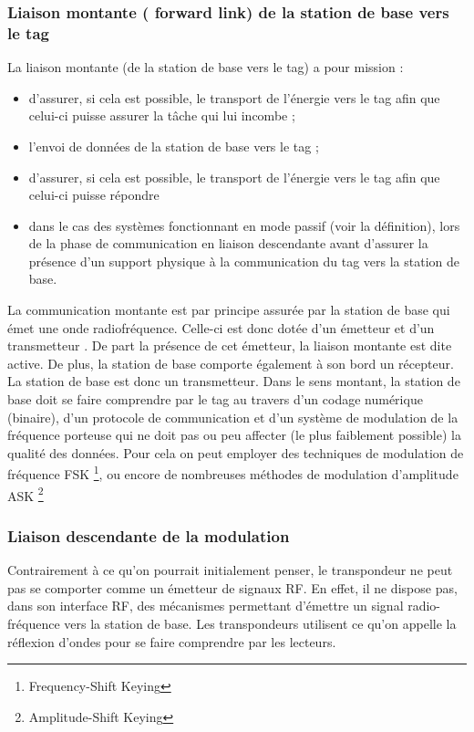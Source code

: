 \documentclass[11pt, a4paper, twoside]{book}
\begin{document}
\subsubsection{Liaison montante ( forward link) de la station de base vers le tag}
La liaison montante (de la station de base vers le tag) a pour mission :
\begin{itemize}
\item d'assurer, si cela est possible, le transport de l'énergie vers le tag afin que celui-ci puisse assurer la tâche qui lui incombe ;
\item l'envoi de données de la station de base vers le tag ;
\item d'assurer, si cela est possible, le transport de l'énergie vers le tag afin que celui-ci puisse répondre
\item dans le cas des systèmes fonctionnant en mode passif (voir la définition), lors de la phase de communication en liaison descendante avant d'assurer la présence d'un support physique à la communication du tag vers la station de base.\\
\end{itemize}
La communication montante est par principe assurée par la station de base qui émet une onde radiofréquence. Celle-ci est donc dotée d’un émetteur et d'un transmetteur . De part la présence de cet émetteur, la liaison montante est dite active. De plus, la station de base comporte également à son bord un récepteur. La station de base est donc un transmetteur. Dans le sens montant, la station de base doit se faire comprendre par le tag au travers d’un codage numérique (binaire), d’un protocole de communication et d’un système de modulation de la fréquence porteuse qui ne doit pas ou peu affecter (le plus faiblement possible) la qualité des données. Pour cela on peut employer des techniques de modulation de fréquence FSK \footnote{Frequency-Shift Keying}, ou encore de nombreuses méthodes de modulation d’amplitude ASK \footnote{Amplitude-Shift Keying}
\subsubsection{Liaison descendante de la modulation}
Contrairement à ce qu'on pourrait initialement penser, le transpondeur ne peut pas se comporter comme un émetteur de signaux RF. En effet, il ne dispose pas, dans son interface RF, des mécanismes permettant d'émettre un signal radio-fréquence vers la station de base. Les transpondeurs utilisent ce qu'on appelle la réflexion d'ondes pour se faire comprendre par les lecteurs. \\
\end{document}
